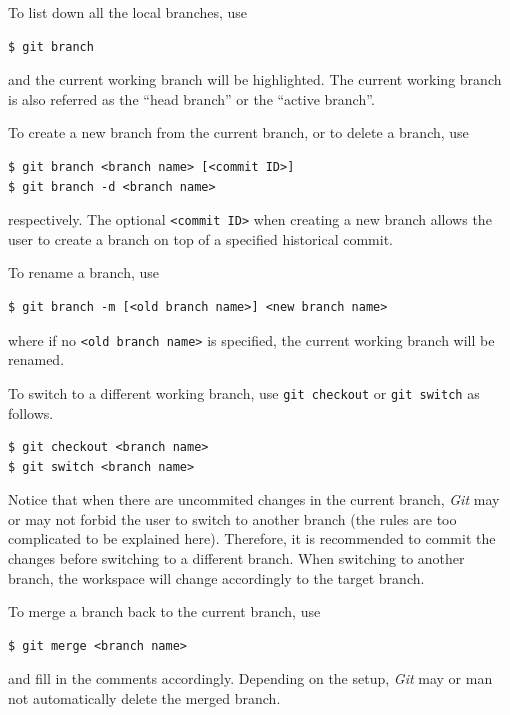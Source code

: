 To list down all the local branches, use
\begin{lstlisting}
$ git branch
\end{lstlisting}
and the current working branch will be highlighted. The current working branch is also referred as the ``head branch'' or the ``active branch''.

To create a new branch from the current branch, or to delete a branch, use
\begin{lstlisting}
$ git branch <branch name> [<commit ID>]
$ git branch -d <branch name>
\end{lstlisting}
respectively. The optional \verb|<commit ID>| when creating a new branch allows the user to create a branch on top of a specified historical commit.

To rename a branch, use
\begin{lstlisting}
$ git branch -m [<old branch name>] <new branch name>
\end{lstlisting}
where if no \verb|<old branch name>| is specified, the current working branch will be renamed.

To switch to a different working branch, use \verb|git checkout| or \verb|git switch| as follows.
\begin{lstlisting}
$ git checkout <branch name>
$ git switch <branch name>
\end{lstlisting}
Notice that when there are uncommited changes in the current branch, \textit{Git} may or may not forbid the user to switch to another branch (the rules are too complicated to be explained here). Therefore, it is recommended to commit the changes before switching to a different branch. When switching to another branch, the workspace will change accordingly to the target branch.

To merge a branch back to the current branch, use
\begin{lstlisting}
$ git merge <branch name>
\end{lstlisting}
and fill in the comments accordingly. Depending on the setup, \textit{Git} may or man not automatically delete the merged branch.

